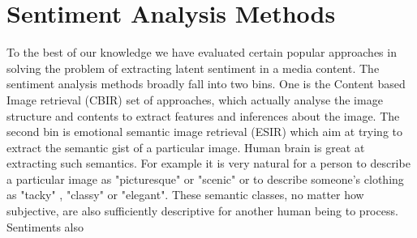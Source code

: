 \section{ Sentiment Analysis Methods }
To the best of our knowledge we have evaluated certain popular approaches in solving the problem of extracting latent sentiment in a media content. The sentiment analysis methods broadly fall into two bins. One is the Content based Image retrieval (CBIR) \cite{CBIRSurvey} set of approaches, which actually analyse the image structure and contents to extract features and inferences about the image. The second bin is emotional semantic image retrieval (ESIR) \cite{ESIRSurvey} which aim at trying to extract the semantic gist of a particular image. Human brain is great at extracting such semantics. For example it is very natural for a person to describe a particular image as "picturesque" or "scenic" or to describe someone's clothing as "tacky" , "classy" or "elegant". These semantic classes, no matter how subjective, are also sufficiently descriptive for another human being to process. Sentiments also